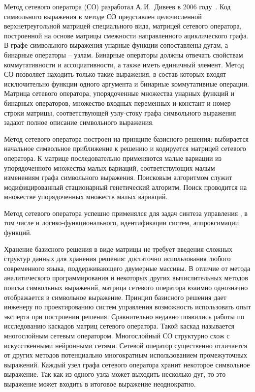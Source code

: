 Метод сетевого оператора (СО) разработал А.\,И.~Дивеев в 2006 году~\cite{Дивеев2006}.
Код символьного выражения в методе СО представлен целочисленной верхнетреугольной матрицей специального вида, матрицей сетевого оператора, построенной на основе матрицы смежности направленного ациклического графа.
В графе символьного выражения унарные функции сопоставлены дугам, а бинарные операторы -- узлам.
Бинарные операторы должны отвечать свойствам коммутативности и ассоциативности, а также иметь единичный элемент.
Метод СО позволяет находить только такие выражения, в состав которых входят исключительно функции одного аргумента и бинарные коммутативные операции.
Матрица сетевого оператора, упорядоченные множества унарных функций и бинарных операторов, множество входных переменных и констант и номер строки матрицы, соответствующей узлу-стоку графа символьного выражения задают полное описание символьного выражения.

Метод сетевого оператора построен на принципе базисного решения: выбирается начальное символьное приближение к решению и кодируется матрицей сетевого оператора.
К матрице последовательно применяются малые вариации из упорядоченного множества малых вариаций, соответствующих малым изменениям графа символьного выражения.
Поисковым алгоритмом служит модифицированный стационарный генетический алгоритм.
Поиск проводится на множестве упорядоченных множеств малых вариаций.

Метод сетевого оператора успешно применялся для задач синтеза управления , в том числе и логико-функционального, идентификации систем, аппроксимации функций.

Хранение базисного решения в виде матрицы не требует введения сложных структур данных для хранения решения: достаточно использования любого современного языка, поддерживающего двумерные массивы.
В отличие от метода аналитического программирования и некоторых других вычислительных методов поиска символьных выражений, матрица сетевого оператора взаимно однозначно отображается в символьное выражение.
Принцип базисного решения дает инженеру по проектированию систем управления возможность использовать опыт эксперта при построении решения.
Сравнительно недавно появились работы по исследованию каскадов матриц сетевого оператора.
Такой каскад называется многослойным сетевым оператором.
Многослойный СО структурно схож с искусственными нейронными сетями.
Сетевой оператор существенно отличается от других методов потенциально многократным использованием промежуточных выражений.
Каждый узел графа сетевого оператора хранит некоторое символьное выражение.
Так как из одного узла может выходить несколько дуг, то это выражение может входить в итоговое выражение неоднократно.

